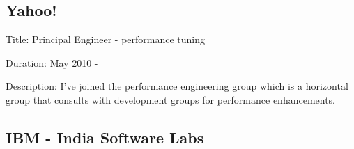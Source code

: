 \documentclass [a4paper,11pt] {article}
\begin{document}
\subsection*{Yahoo!}
\begin{description}
\item{Title:} Principal Engineer - performance tuning
\item{Duration:} May 2010 - 
\item{Description:} I've joined the performance engineering group which is a
horizontal group that consults with development groups for performance
enhancements. 
\end{description}


\subsection*{IBM - India Software Labs}
\end{document}
